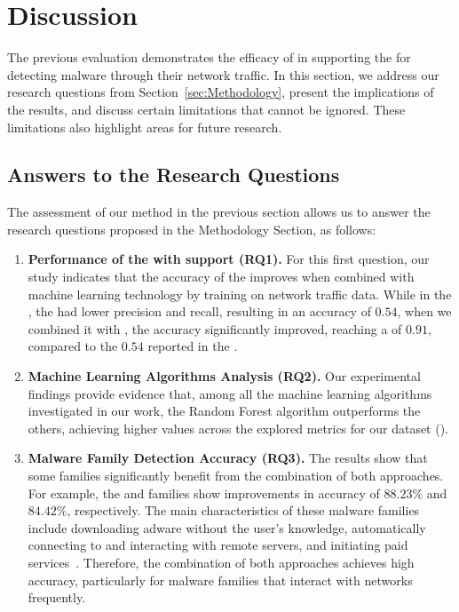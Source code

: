 \section{Discussion}\label{sec:discussion}

The previous evaluation demonstrates the efficacy of \net in supporting the \mas for detecting malware through their network traffic. In this section, we address our research questions from Section~\ref{sec:Methodology}, present the implications of the results, and discuss certain limitations that cannot be ignored. These limitations also highlight areas for future research.

\subsection{Answers to the Research Questions}\label{sec:questions}

The assessment of our method in the previous section allows us to answer the research questions proposed in the Methodology Section, as follows:

\begin{enumerate}
    \item \textbf{Performance of the \mas with \net support (RQ1).} For this first question, our study indicates that the accuracy of the \mas improves when combined with machine learning technology by training on network traffic data. While in the \fhc, the \mas had lower precision and recall, resulting in an accuracy of $0.54$, when we combined it with \net, the accuracy significantly improved, reaching a \fone of $0.91$, compared to the $0.54$ reported in the \fhc.
    
    \item \textbf{Machine Learning Algorithms Analysis (RQ2).} Our experimental findings provide evidence that, among all the machine learning algorithms investigated in our work, the Random Forest algorithm outperforms the others, achieving higher values across the explored metrics for our dataset (\cds).
    
    \item \textbf{Malware Family Detection Accuracy (RQ3).} The results show that some families significantly benefit from the combination of both approaches. For example, the \tjk and \gps families show improvements in accuracy of $88.23\%$ and $84.42\%$, respectively. The main characteristics of these malware families include downloading adware without the user's knowledge, automatically connecting to and interacting with remote servers, and initiating paid services~\cite{DBLP:journals/jnca/WangCYYPJ19}. Therefore, the combination of both approaches achieves high accuracy, particularly for malware families that interact with networks frequently.
\end{enumerate}

